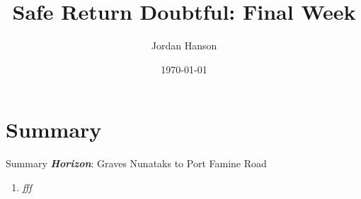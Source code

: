 \documentclass{beamer}
\title{Safe Return Doubtful: Final Week}
\date{\today}
\author{Jordan Hanson}
\institute{Whittier College Department of Physics and Astronomy}
\begin{document}
\maketitle

\section{Summary}

\begin{frame}{Summary}
\textbf{\textit{Horizon}}: Graves Nunataks to Port Famine Road
\begin{enumerate}
\item \textit{fff}
\end{enumerate}
\end{frame}
\end{document}
